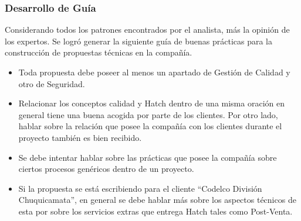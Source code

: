 \subsubsection{Desarrollo de Guía}
    Considerando todos los patrones encontrados por el analista, más la opinión de los expertos. Se logró generar la siguiente guía de buenas prácticas para la construcción de propuestas técnicas en la compañía.
    \begin{itemize}
        \item Toda propuesta debe poseer al menos un apartado de Gestión de Calidad y otro de Seguridad.
        \item Relacionar los conceptos calidad y Hatch dentro de una misma oración en general tiene una buena acogida por parte de los clientes. Por otro lado, hablar sobre la relación que posee la compañía con los clientes durante el proyecto también es bien recibido.
        \item Se debe intentar hablar sobre las prácticas que posee la compañía sobre ciertos procesos genéricos dentro de un proyecto.
        \item Si la propuesta se está escribiendo para el cliente ``Codelco División Chuquicamata'', en general se debe hablar más sobre los aspectos técnicos de esta por sobre los servicios extras que entrega Hatch tales como Post-Venta.
    \end{itemize}
